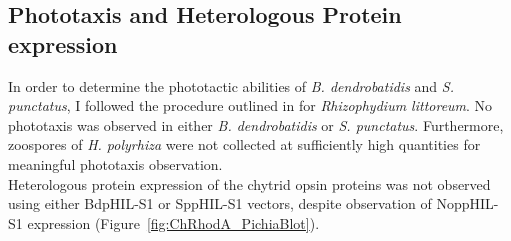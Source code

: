 \subsection*{Phototaxis and Heterologous Protein expression}
In order to determine the phototactic abilities of \textit{B. dendrobatidis} and \textit{S. punctatus}, I followed the procedure outlined in \cite{Muehlstein1987} for \textit{Rhizophydium littoreum}. No phototaxis was observed in either \textit{B. dendrobatidis} or \textit{S. punctatus}. Furthermore, zoospores of \textit{H. polyrhiza} were not collected at sufficiently high quantities for meaningful phototaxis observation.\\
\indent Heterologous protein expression of the chytrid opsin proteins was not observed using either BdpHIL-S1 or SppHIL-S1 vectors, despite observation of NoppHIL-S1 expression (Figure~\ref{fig:ChRhodA_PichiaBlot}).\\ 

